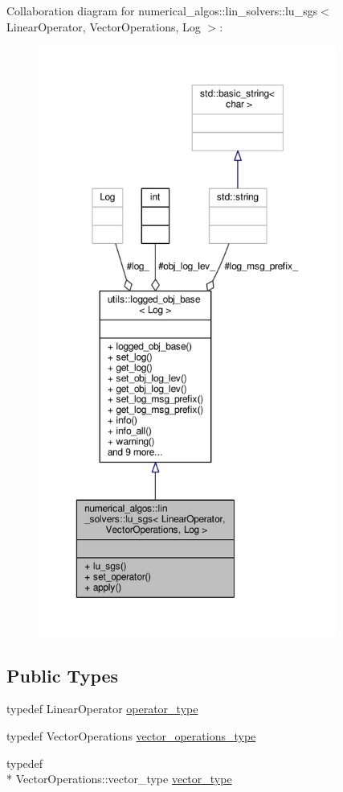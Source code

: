 Collaboration diagram for numerical\-\_\-algos\-:\-:lin\-\_\-solvers\-:\-:lu\-\_\-sgs$<$ Linear\-Operator, Vector\-Operations, Log $>$\-:\nopagebreak
\begin{figure}[H]
\begin{center}
\leavevmode
\includegraphics[height=550pt]{classnumerical__algos_1_1lin__solvers_1_1lu__sgs__coll__graph}
\end{center}
\end{figure}
\subsection*{Public Types}
\begin{DoxyCompactItemize}
\item 
typedef Linear\-Operator \hyperlink{classnumerical__algos_1_1lin__solvers_1_1lu__sgs_aa14a4c02a91393066a7582cb5e138e2c}{operator\-\_\-type}
\item 
typedef Vector\-Operations \hyperlink{classnumerical__algos_1_1lin__solvers_1_1lu__sgs_ac92691bd7442a226c10fab88f4f5fd0d}{vector\-\_\-operations\-\_\-type}
\item 
typedef \\*
Vector\-Operations\-::vector\-\_\-type \hyperlink{classnumerical__algos_1_1lin__solvers_1_1lu__sgs_ac04dfa258dce932c55628e33aa5cf09e}{vector\-\_\-type}
\end{DoxyCompactItemize}
